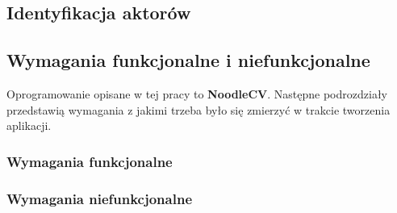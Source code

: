 \subsection{Identyfikacja aktorów}

\subsection{Wymagania funkcjonalne i niefunkcjonalne}
Oprogramowanie opisane w tej pracy to \textbf{NoodleCV}. Następne podrozdziały przedstawią wymagania z jakimi trzeba było się zmierzyć w trakcie tworzenia aplikacji.
\subsubsection{Wymagania funkcjonalne}

\subsubsection{Wymagania niefunkcjonalne}
